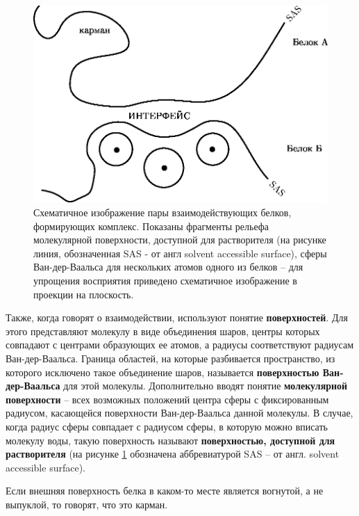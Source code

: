 \begin{figure}
%
\includegraphics[width=\linewidth]{ppi.eps}
\caption{\small{Схематичное изображение пары взаимодействующих белков, формирующих комплекс. Показаны фрагменты рельефа молекулярной поверхности, доступной для растворителя (на рисунке линия, обозначенная SAS - от англ solvent accessible surface), сферы Ван-дер-Ваальса для нескольких атомов одного из белков -- для упрощения восприятия  приведено схематичное изображение в проекции на плоскость. }}
\label{fig:ppi}
\end{figure}


Также, когда говорят о взаимодействии, используют понятие \textbf{поверхностей}. Для этого представляют молекулу в виде объединения шаров, центры которых совпадают с центрами образующих ее атомов, а радиусы соответствуют радиусам Ван-дер-Ваальса. Граница областей, на которые разбивается пространство, из которого исключено такое объединение шаров, называется \textbf{поверхностью Ван-дер-Ваальса} для этой молекулы. Дополнительно вводят понятие \textbf{молекулярной поверхности} -- всех возможных положений центра сферы с фиксированным радиусом, касающейся поверхности Ван-дер-Ваальса данной молекулы. В случае, когда радиус сферы совпадает с радиусом сферы, в которую можно вписать молекулу воды, такую поверхность называют \textbf{поверхностью, доступной для растворителя} (на рисунке \ref{fig:ppi} обозначена аббревиатурой SAS -- от англ. solvent accessible surface).

Если внешняя поверхность белка в каком-то месте является вогнутой, а не выпуклой, то говорят, что это карман. 




